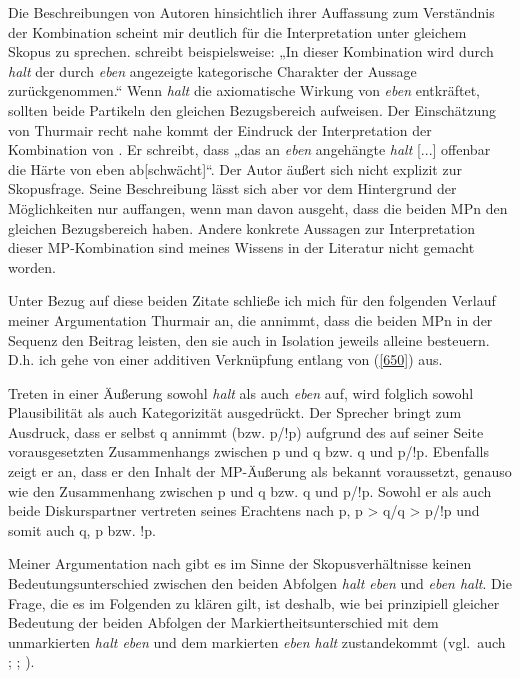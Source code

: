 Die Beschreibungen von Autoren hinsichtlich ihrer Auffassung zum Verständnis der Kombination scheint mir deutlich für die Interpretation unter gleichem Skopus zu sprechen. \citet[257]{Thurmair1989} schreibt beispielsweise: „In dieser Kombination wird durch \textit{halt} der durch \textit{eben} angezeigte kategorische Charakter der Aussage zurückgenommen.“ Wenn \textit{halt} die axiomatische Wirkung von \textit{eben} entkräftet, sollten beide Partikeln den gleichen Bezugsbereich aufweisen. Der Einschätzung von Thurmair recht nahe kommt der Eindruck der Interpretation der Kombination von \citet[226]{Dittmar2000}. Er schreibt, dass „das an \textit{eben} angehängte \textit{halt} [...] offenbar die Härte von eben ab[schwächt]“. Der Autor äußert sich nicht explizit zur  Skopusfrage. Seine Beschreibung lässt sich aber vor dem Hintergrund der Möglichkeiten nur auffangen, wenn man davon ausgeht, dass die beiden MPn den gleichen Bezugsbereich haben. Andere konkrete Aussagen zur Interpretation dieser MP-Kombination sind meines Wissens in der Literatur nicht gemacht worden.

Unter Bezug auf diese beiden Zitate schließe ich mich für den folgenden Verlauf meiner Argumentation Thurmair an, die annimmt, dass die beiden MPn in der Sequenz den Beitrag leisten, den sie auch in Isolation jeweils alleine besteuern.  D.h. ich gehe von einer additiven Verknüpfung entlang von (\ref{650}) aus.

Treten in einer Äußerung sowohl \textit{halt} als auch \textit{eben} auf, wird folglich sowohl Plausibilität als auch Kategorizität ausgedrückt. Der Sprecher bringt zum Ausdruck, dass er selbst q annimmt (bzw. p/!p) aufgrund des auf seiner Seite vorausgesetzten Zusammenhangs zwischen p und q bzw. q und p/!p. Ebenfalls zeigt er an, dass er den Inhalt der MP-Äußerung als bekannt voraussetzt, genauso wie den Zusammenhang zwischen p und q bzw. q und p/!p. Sowohl er als auch beide Diskurspartner vertreten seines Erachtens nach p, p > q/q > p/!p und somit auch q, p bzw. !p.

Meiner Argumentation nach gibt es im Sinne der Skopusverhältnisse keinen Bedeutungsunterschied zwischen den beiden Abfolgen \textit{halt eben} und \textit{eben halt}. Die Frage, die es im Folgenden zu klären gilt, ist deshalb, wie bei prinzipiell glei\-cher Bedeutung der beiden Abfolgen der Markiertheitsunterschied mit dem unmarkierten \textit{halt eben} und dem markierten \textit{eben halt} zustandekommt (vgl.\ auch \citealt[162--164]{Mueller2016a}; \citeyear[169--177]{Mueller2016b}; \citeyear[244--248]{Mueller2017a}).

